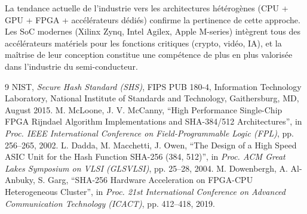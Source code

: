 La tendance actuelle de l'industrie vers les architectures hétérogènes (CPU + GPU + FPGA + accélérateurs dédiés) confirme la pertinence de cette approche. Les SoC modernes (Xilinx Zynq, Intel Agilex, Apple M-series) intègrent tous des accélérateurs matériels pour les fonctions critiques (crypto, vidéo, IA), et la maîtrise de leur conception constitue une compétence de plus en plus valorisée dans l'industrie du semi-conducteur.

\newpage
\begin{thebibliography}{9}
 NIST, \emph{Secure Hash Standard (SHS)}, FIPS PUB 180-4, Information Technology Laboratory, National Institute of Standards and Technology, Gaithersburg, MD, August 2015.
 M. McLoone, J. V. McCanny, ``High Performance Single-Chip FPGA Rijndael Algorithm Implementations and SHA-384/512 Architectures'', in \emph{Proc. IEEE International Conference on Field-Programmable Logic (FPL)}, pp. 256--265, 2002.
 L. Dadda, M. Macchetti, J. Owen, ``The Design of a High Speed ASIC Unit for the Hash Function SHA-256 (384, 512)'', in \emph{Proc. ACM Great Lakes Symposium on VLSI (GLSVLSI)}, pp. 25--28, 2004.
 M. Dowenbergh, A. Al-Anbuky, S. Garg, ``SHA-256 Hardware Acceleration on FPGA-CPU Heterogeneous Cluster'', in \emph{Proc. 21st International Conference on Advanced Communication Technology (ICACT)}, pp. 412--418, 2019.
\end{thebibliography}

